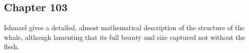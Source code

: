 \subsection{Chapter 103}

Ishmael gives a detailed, almost mathematical description of the structure of
the whale, although lamenting that its full beauty and size captured not
without the flesh.
